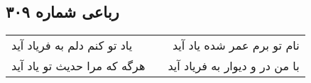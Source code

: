 \begin{center}
\section*{رباعی شماره ۳۰۹}
\label{sec:sh309}
\begin{longtable}{l p{0.5cm} r}
یاد تو کنم دلم به فریاد آید
&&
نام تو برم عمر شده یاد آید
\\
هرگه که مرا حدیث تو یاد آید
&&
با من در و دیوار به فریاد آید
\\
\end{longtable}
\end{center}
